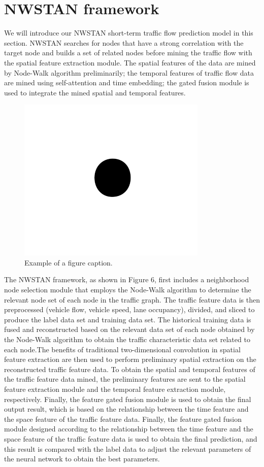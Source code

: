 \documentclass[conference]{IEEEtran}
\begin{document}
\section{NWSTAN framework}
We will introduce our NWSTAN short-term traffic flow prediction model in this section. NWSTAN searches for nodes that have a strong correlation with the target node and builds a set of related nodes before mining the traffic flow with the spatial feature extraction module. The spatial features of the data are mined by Node-Walk algorithm preliminarily; the temporal features of traffic flow data are mined using self-attention and time embedding; the gated fusion module is used to integrate the mined spatial and temporal features.

\begin{figure}[htbp]
    \centerline{\includegraphics{fig1.png}}
    \caption{Example of a figure caption.}
    \label{fig}
\end{figure}

\par
The NWSTAN framework, as shown in Figure 6, first includes a neighborhood node selection module that employs the Node-Walk algorithm to determine the relevant node set of each node in the traffic graph. The traffic feature data is then preprocessed (vehicle flow, vehicle speed, lane occupancy), divided, and sliced to produce the label data set and training data set. The historical training data is fused and reconstructed based on the relevant data set of each node obtained by the Node-Walk algorithm to obtain the traffic characteristic data set related to each node.The benefits of traditional two-dimensional convolution in spatial feature extraction are then used to perform preliminary spatial extraction on the reconstructed traffic feature data. To obtain the spatial and temporal features of the traffic feature data mined, the preliminary features are sent to the spatial feature extraction module and the temporal feature extraction module, respectively. Finally, the feature gated fusion module is used to obtain the final output result, which is based on the relationship between the time feature and the space feature of the traffic feature data. Finally, the feature gated fusion module designed according to the relationship between the time feature and the space feature of the traffic feature data is used to obtain the final prediction, and this result is compared with the label data to adjust the relevant parameters of the neural network to obtain the best parameters.
\end{document}
